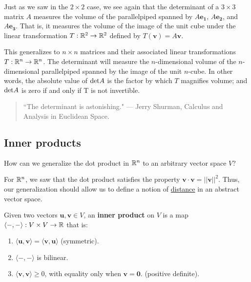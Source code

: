 Just as we saw in the $2 \times 2$ case, we see again that the determinant of a $3 \times 3$ matrix $A$ measures the volume of the parallelpiped spanned by $A\bm{e_1}$, $A\bm{e_2}$, and $A\bm{e_3}$.  That is, it measures the volume of the image of the unit cube under the linear transformation $T: \mathbb{R}^2 \to \mathbb{R}^2$ defined by $T(\bm{v}) = A\bm{v}$.

This generalizes to $n \times n$ matrices and their associated linear transformations $T:\mathbb{R}^n\to \mathbb{R}^n$.  The determinant will measure the $n$-dimensional volume of the $n$-dimensional parallelpiped spanned by the image of the unit $n$-cube.  In other words, the absolute value of $\textnormal{det}A$ is the factor by which $T$ magnifies volume; and $\textnormal{det}A$ is zero if and only if T is not invertible. 



    \begin{quote}
        ``The determinant is astonishing."       --- Jerry Shurman, \textnormal{Calculus and Analysis in Euclidean Space}.
    \end{quote}








\subsection{Inner products}

\begin{motivating}
How can we generalize the dot product in  $\mathbb{R}^n$ to an arbitrary vector space $V$?  
\end{motivating}

For $\mathbb{R}^n$, we saw that the dot product satisfies the property $\bm{v} \cdot \bm{v} = ||\bm{v}||^2$. Thus, our generalization should allow us to define a notion of \underline{distance} in an abstract vector space.

\begin{definition}
    
    Given two vectors $\bm{u},\bm{v} \in V$, an \textbf{inner product} on $V$ is a map $\langle - , - \rangle :  V \times V \to \mathbb{R}$ that is:
    \vspace{1em}
    
    \begin{enumerate}
        \item $\langle \bm{u}, \bm{v} \rangle = \langle \bm{v}, \bm{u} \rangle$ (symmetric).
        \item $\langle - , - \rangle$ is bilinear.
        \item $\langle \bm{v}, \bm{v} \rangle \geq 0$, with equality only when $\bm{v} = \bm{0}$. (positive definite).  
    \end{enumerate}
    
    \end{definition}

